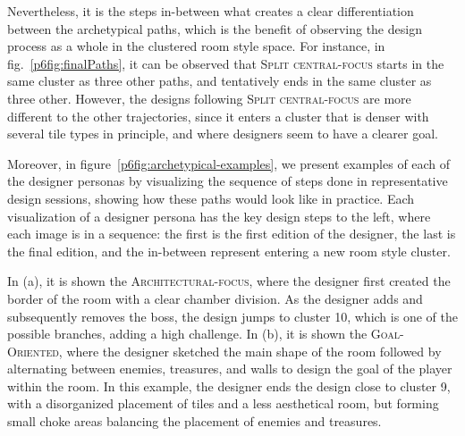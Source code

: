 Nevertheless, it is the steps in-between what creates a clear differentiation between the archetypical paths, which is the benefit of observing the design process as a whole in the clustered room style space. For instance, in fig.~\ref{p6fig:finalPaths}, it can be observed that \textsc{Split central-focus} starts in the same cluster as three other paths, and tentatively ends in the same cluster as three other. However, the designs following \textsc{Split central-focus} are more different to the other trajectories, since it enters a cluster that is denser with several tile types in principle, and where designers seem to have a clearer goal.



Moreover, in figure~\ref{p6fig:archetypical-examples}, we present examples of each of the designer personas by visualizing the sequence of steps done in representative design sessions, showing how these paths would look like in practice. Each visualization of a designer persona has the key design steps to the left, where each image is in a sequence: the first is the first edition of the designer, the last is the final edition, and the in-between represent entering a new room style cluster. 

In (a), it is shown the \textsc{Architectural-focus}, where the designer first created the border of the room with a clear chamber division. As the designer adds and subsequently removes the boss, the design jumps to cluster 10, which is one of the possible branches, adding a high challenge. In (b), it is shown the \textsc{Goal-Oriented}, where the designer sketched the main shape of the room followed by alternating between enemies, treasures, and walls to design the goal of the player within the room. In this example, the designer ends the design close to cluster 9, with a disorganized placement of tiles and a less aesthetical room, but forming small choke areas balancing the placement of enemies and treasures.

